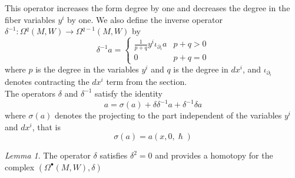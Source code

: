 \documentclass[
  12pt,
  a4paper, oneside
]{report}
\renewcommand{\hbar}{\hslash}
\theoremstyle{bolddef}
\theoremstyle{remark}
\newtheorem{lemma}[theorem]{Lemma}
\numberwithin{equation}{chapter}
\begin{document}
This operator increases the form degree by one and decreases the degree
in the fiber variables $y^i$ by one. We also define the inverse operator $\delta^{-1} : \Omega^q(M,W) \to \Omega^{q-1}(M,W)$ by
\[
\delta^{-1} a =
\begin{cases}
\displaystyle
\frac{1}{p+q} y^i \iota_{\partial_i} a & p+q>0 \\
0 & p+q=0
\end{cases}
\]
where $p$ is the degree in the variables $y^i$ and $q$ is the degree in
$dx^i$, and $\iota_{\partial_{i}}$ denotes contracting the $dx^{i}$ term from the section. \\
The operators $\delta$ and $\delta^{-1}$ satisfy the identity
\begin{equation}\label{eq:delta-identity}
    a = \sigma(a) + \delta\delta^{-1}a + \delta^{-1}\delta a
\end{equation}
where $\sigma(a)$ denotes the projecting to the part independent of
the variables $y^i$ and $dx^i$, that is
\[
\sigma(a) = a(x,0,\hbar)
\]

\begin{lemma}
The operator $\delta$ satisfies $\delta^2 = 0$ and provides a homotopy for the complex
$(\Omega^\bullet(M,W),\delta)$
\end{lemma}
\end{document}
